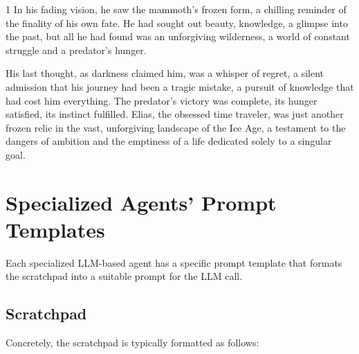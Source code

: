 \documentclass{article}
\newcommand{\Agentsroomzs}{\textsc{Agents' Room$_{ZS}$}}
\begin{document}
\begin{tcolorbox}[colback=white, colframe=gray!30!white, coltitle=black, parskip=5mm, title=
    \textbf{System output: \Agentsroomzs}, breakable]
\begin{spacing}{1}
In his fading vision, he saw the mammoth's frozen form, a chilling reminder of the finality of his own fate. He had sought out beauty, knowledge, a glimpse into the past, but all he had found was an unforgiving wilderness, a world of constant struggle and a predator's hunger.\\\par

His last thought, as darkness claimed him, was a whisper of regret, a silent admission that his journey had been a tragic mistake, a pursuit of knowledge that had cost him everything. The predator's victory was complete, its hunger satisfied, its instinct fulfilled. Elias, the obsessed time traveler, was just another frozen relic in the vast, unforgiving landscape of the Ice Age, a testament to the dangers of ambition and the emptiness of a life dedicated solely to a singular goal.\\\par
    \end{spacing}
    \end{tcolorbox}
	
\section{Specialized Agents' Prompt Templates}
\label{appendix:agent_prompts}

Each specialized LLM-based agent has a specific prompt template that formats the scratchpad into a suitable prompt for the LLM call.

\subsection{Scratchpad}

Concretely, the scratchpad is typically formatted as follows: 
\end{document}
